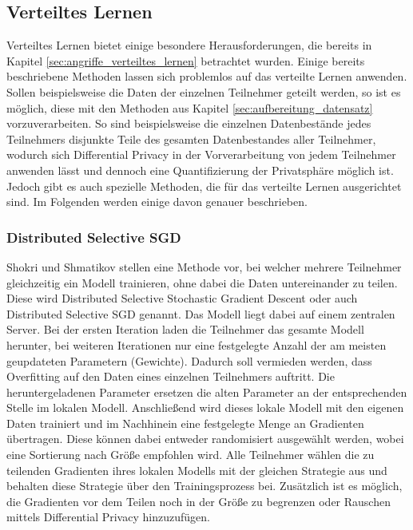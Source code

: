\subsection{Verteiltes Lernen}\label{sec:verteiltes_lernen}

Verteiltes Lernen bietet einige besondere Herausforderungen, die bereits in Kapitel \ref{sec:angriffe_verteiltes_lernen} betrachtet wurden. 
Einige bereits beschriebene Methoden lassen sich problemlos auf das verteilte Lernen anwenden.
Sollen beispielsweise die Daten der einzelnen Teilnehmer geteilt werden, so ist es möglich, diese mit den Methoden aus Kapitel \ref{sec:aufbereitung_datensatz} vorzuverarbeiten.
So sind beispielsweise die einzelnen Datenbestände jedes Teilnehmers disjunkte Teile des gesamten Datenbestandes aller Teilnehmer, wodurch sich Differential Privacy in der Vorverarbeitung von jedem Teilnehmer anwenden lässt und dennoch eine Quantifizierung der Privatsphäre möglich ist.
Jedoch gibt es auch spezielle Methoden, die für das verteilte Lernen ausgerichtet sind.
Im Folgenden werden einige davon genauer beschrieben.

\subsubsection*{Distributed Selective SGD}
Shokri und Shmatikov \cite{P-78} stellen eine Methode vor, bei welcher mehrere Teilnehmer gleichzeitig ein Modell trainieren, ohne dabei die Daten untereinander zu teilen.
Diese wird Distributed Selective Stochastic Gradient Descent oder auch Distributed Selective SGD genannt.
Das Modell liegt dabei auf einem zentralen Server.
Bei der ersten Iteration laden die Teilnehmer das gesamte Modell herunter, bei weiteren Iterationen nur eine festgelegte Anzahl der am meisten geupdateten Parametern (Gewichte).
Dadurch soll vermieden werden, dass Overfitting auf den Daten eines einzelnen Teilnehmers auftritt.
Die heruntergeladenen Parameter ersetzen die alten Parameter an der entsprechenden Stelle im lokalen Modell.
Anschließend wird dieses lokale Modell mit den eigenen Daten trainiert und im Nachhinein eine festgelegte Menge an Gradienten übertragen. 
Diese können dabei entweder randomisiert ausgewählt werden, wobei eine Sortierung nach Größe empfohlen wird.
Alle Teilnehmer wählen die zu teilenden Gradienten ihres lokalen Modells mit der gleichen Strategie aus und behalten diese Strategie über den Trainingsprozess bei.
Zusätzlich ist es möglich, die Gradienten vor dem Teilen noch in der Größe zu begrenzen oder Rauschen mittels Differential Privacy hinzuzufügen.

